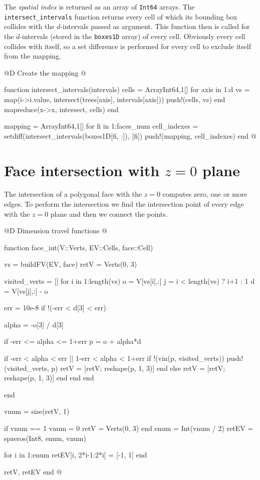 The \textit{spatial index} is returned as an array of \texttt{Int64} arrays.
The \texttt{intersect\_intervals} function returns every cell of which its bounding box collides with 
the $d$-intervals passed as argument. This function then is called for the $d$-intervals (stored in the \texttt{boxes1D} array) of every cell.
Obviously every cell collides with itself, so a set difference is performed for every cell to exclude itself from the mapping.

@D Create the mapping
@{function intersect_intervals(intervals)
    cells = Array{Int64,1}[]
    for axis in 1:d
        vs = map(i->i.value, intersect(trees[axis], intervals[axis]))
        push!(cells, vs)
    end
    mapreduce(x->x, intersect, cells)
end

mapping = Array{Int64,1}[]
for fi in 1:faces_num
    cell_indexes = setdiff(intersect_intervals(boxes1D[fi, :]), [fi])
    push!(mapping, cell_indexes)
end
@}


\section{Face intersection with $z=0$ plane}

The intersection of a polygonal face with the $z=0$ computes
zero, one or more edges. To perform the intersection we find the
intersection point of every edge with the $z=0$ plane and then
we connect the points.

@D Dimension travel functions
@{function face_int(V::Verts, EV::Cells, face::Cell)

    vs = buildFV(EV, face)
    retV = Verts(0, 3)
    
    visited_verts = []
    for i in 1:length(vs)
        o = V[vs[i],:]
        j = i < length(vs) ? i+1 : 1
        d = V[vs[j],:] - o

        err = 10e-8
        if !(-err < d[3] < err)

            alpha = -o[3] / d[3]

            if -err <= alpha <= 1+err
                p = o + alpha*d

                if -err < alpha < err || 1-err < alpha < 1+err
                    if !(vin(p, visited_verts))
                        push!(visited_verts, p)
                        retV = [retV; reshape(p, 1, 3)] 
                    end
                else
                    retV = [retV; reshape(p, 1, 3)]
                end
            end
        end

    end

    vnum = size(retV, 1)


    if vnum == 1
        vnum = 0
        retV = Verts(0, 3)
    end
    enum = Int(vnum / 2)
    retEV = spzeros(Int8, enum, vnum)

    for i in 1:enum
        retEV[i, 2*i-1:2*i] = [-1, 1]
    end

    retV, retEV
end
@} 
